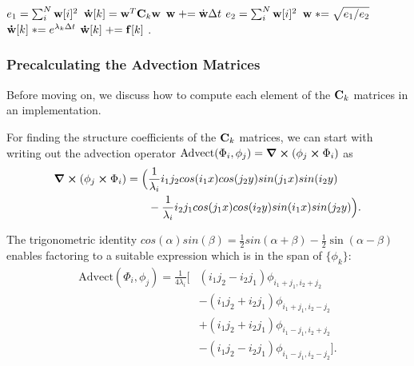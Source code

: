 \begin{algorithmic}
    \State $e_1 = \sum_i^N \vb{w}[i]^2$ 
        \State $\vb{\dot{w}}[k] = \vb{w}^T \vb{C}_k \vb{w}$
    \EndFor 
    \State $\vb{w} \mathrel{+}= \dot{\vb{w}} \Delta t$
    \State $e_2 = \sum_i^N \vb{w}[i]^2$ 
    \State $\vb{w} \mathrel{*}= \sqrt{e_1 / e_2}$
    \State $\vb{\dot{w}}[k] \mathrel{*}= e^{\lambda_k \Delta t}$
    \State $\vb{\dot{w}}[k] \mathrel{+}= \vb{f}[k]$
    \EndFor.
\end{algorithmic}

\subsubsection*{Precalculating the Advection Matrices}
Before moving on, we discuss how to compute each element of the $\vb{C}_k$
matrices in an implementation.

For finding the structure coefficients of the $\vb{C}_k$ matrices, we can start
with writing out the advection operator $\text{Advect}(\Phi_i, \phi_j)
= \curl(\phi_j \cross \Phi_i)$ as
\begin{align*}
\curl(\phi_j \cross \Phi_i) = \Big(
    &\frac{1}{\lambda_i}i_1j_2cos(i_1x)cos(j_2y)sin(j_1x)sin(i_2y)\\
    &-\frac{1}{\lambda_i}i_2j_1cos(j_1x)cos(i_2y)sin(i_1x)sin(j_2y)
\Big).
\end{align*}

The trigonometric identity $cos(\alpha)sin(\beta)
= \frac{1}{2}sin(\alpha+\beta)-\frac{1}{2}\sin(\alpha-\beta)$ enables factoring
to a suitable expression which is in the span of $\{\phi_k\}$:
\begin{align*}
\text{Advect}(\Phi_i,\phi_j)= \frac{1}{4\lambda_{i}}
    \Big[&(i_1 j_2 - i_2 j_1)\phi_{i_1+j_1, i_2+j_2}\\
     &-(i_1 j_2 + i_2 j_1)\phi_{i_1+j_1, i_2-j_2}\\
     &+(i_1 j_2 + i_2 j_1)\phi_{i_1-j_1, i_2+j_2}\\
     &-(i_1 j_2 - i_2 j_1)\phi_{i_1-j_1, i_2-j_2}\Big].\\
\end{align*}


